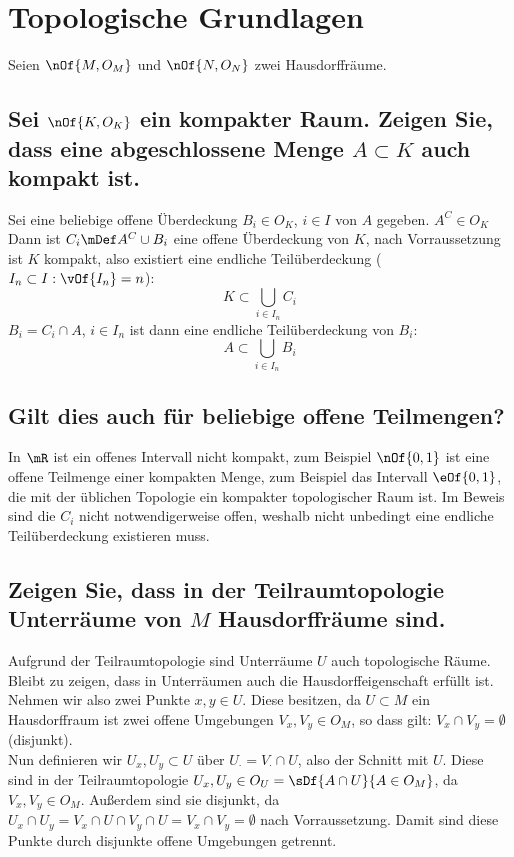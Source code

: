 \section{Topologische Grundlagen}
Seien $\nOf{M,O_M}$ und $\nOf{N,O_N}$ zwei Hausdorffräume.

\subsection{Sei $\nOf{K,O_K}$ ein kompakter Raum. Zeigen Sie, dass eine abgeschlossene Menge $A\subset K$ auch kompakt ist.}
Sei eine beliebige offene Überdeckung $B_i\in O_K$, $i\in I$ von $A$ gegeben. $A^C \in O_K$
Dann ist $C_i \mDef A^C\cup B_i$ eine offene Überdeckung von $K$, nach Vorraussetzung ist $K$ kompakt, also existiert eine endliche Teilüberdeckung ($I_n\subset I : \vOf{I_n} = n$):
\begin{equation}
	K \subset \bigcup\limits_{i\in I_n} C_i
\end{equation}
$B_i = C_i\cap A$, $i\in I_n$ ist dann eine endliche Teilüberdeckung von $B_i$:
\begin{equation}
	A\subset \bigcup\limits_{i\in I_n} B_i
\end{equation}

\subsection{Gilt dies auch für beliebige offene Teilmengen?}
In $\mR$ ist ein offenes Intervall nicht kompakt, zum Beispiel $\nOf{0,1}$ ist eine offene Teilmenge einer kompakten Menge, zum Beispiel das Intervall $\eOf{0,1}$, die mit der üblichen Topologie ein kompakter topologischer Raum ist. Im Beweis sind die $C_i$ nicht notwendigerweise offen, weshalb nicht unbedingt eine endliche Teilüberdeckung existieren muss.

\subsection{Zeigen Sie, dass in der Teilraumtopologie Unterräume von $M$ Hausdorffräume sind.}
Aufgrund der Teilraumtopologie sind Unterräume $U$ auch topologische Räume.\\
Bleibt zu zeigen, dass in Unterräumen auch die Hausdorffeigenschaft erfüllt ist. Nehmen wir also zwei Punkte $x,y \in U$. Diese besitzen, da $U\subset M$ ein Hausdorffraum ist zwei offene Umgebungen $V_x, V_y \in O_M$, so dass gilt: $V_x \cap V_y = \emptyset$ (disjunkt).\\
Nun definieren wir $U_x, U_y \subset U$ über $U_{\cdot} = V_{\cdot} \cap U$, also der Schnitt mit $U$. Diese sind in der Teilraumtopologie $U_x,U_y \in O_U = \sDf{A \cap U}{A \in O_M}$, da $V_x, V_y \in O_M$. Außerdem sind sie disjunkt, da $U_x \cap U_y = V_x \cap U \cap V_y \cap U = V_x \cap V_y = \emptyset$ nach Vorraussetzung. Damit sind diese Punkte durch disjunkte offene Umgebungen getrennt.

